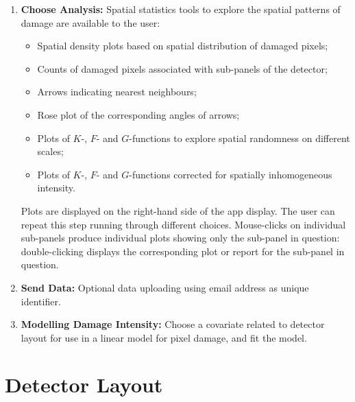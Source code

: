\documentclass[11pt,a4paper]{article}
\begin{document}
\begin{mdframed}
\begin{enumerate}
\item {\bf Choose Analysis:} 
Spatial statistics tools to explore the spatial patterns of damage are available
to the user:
\begin{itemize}
\item Spatial density plots based on spatial distribution
of damaged pixels;
\item Counts of damaged pixels associated with sub-panels of the detector;
\item Arrows indicating nearest neighbours;
\item Rose plot of the corresponding angles of arrows;
\item Plots of $K$-, $F$- and $G$-functions to explore spatial randomness on different scales;
\item Plots of $K$-, $F$- and $G$-functions corrected for spatially inhomogeneous intensity.
\end{itemize}
Plots are displayed on the right-hand side of the 
app display. The user can repeat this step running through different choices. Mouse-clicks on individual sub-panels produce individual plots showing only the sub-panel in question: double-clicking displays the corresponding plot or report for the sub-panel in question.

\item {\bf Send Data:} 
Optional data uploading using email address as unique identifier.

\item {\bf Modelling Damage Intensity:} 
Choose a covariate related to detector layout 
for use in a linear model for pixel damage,
and fit the model.

\end{enumerate}

\medskip

\end{mdframed}

\medskip

\section{Detector Layout}\label{layout}
\end{document}
